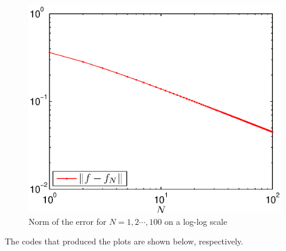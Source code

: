 \begin{solution}
\begin{enumerate}
\begin{figure}
\centering
\includegraphics[scale=0.9]{ffnnormc}
\vspace{-.4cm}
\caption{Norm of the error for $N=1,2 \cdots,100$ on a log-log scale}
\end{figure}

\newpage
The codes that produced the plots are shown below, respectively.




\end{enumerate}

\end{solution}
